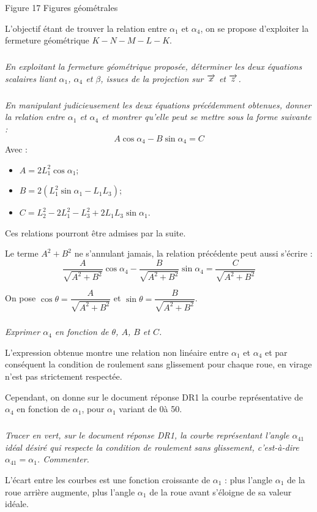 \documentclass[10pt]{article}
\begin{document}
Figure 17 Figures géométrales

L’objectif étant de trouver la relation entre $\alpha_1$ et $\alpha_4$, on se propose d’exploiter la fermeture géométrique $K-N-M-L-K$.

\subparagraph{}\textit{En exploitant la fermeture géométrique proposée, déterminer les deux équations scalaires liant $\alpha_1$, $\alpha_4$ et $\beta$, issues de la projection sur 
$\overrightarrow{x}$ et  $\overrightarrow{z}$.}
 
\subparagraph{}\textit{En manipulant judicieusement les deux équations précédemment obtenues, donner la relation entre $\alpha_1$ et $\alpha_4$ et montrer qu’elle peut se mettre sous la forme suivante :}
$$
A\cos\alpha_4 - B\sin\alpha_4 = C
$$
Avec :
\begin{itemize}
\item $A = 2L_1^2 \cos\alpha_1$;
\item $B = 2\left(L_1^2 \sin\alpha_1 -L_1L_3\right)$;
\item $C = L_2^2 -2L_1^2 -L_3^2 + 2L_1L_3\sin\alpha_1$.
\end{itemize}
	 
Ces relations pourront être admises par la suite.

 Le terme $A^2+B^2$ ne s’annulant jamais, la relation précédente peut aussi s’écrire :
 $$
 \dfrac{A}{\sqrt{A^2+B^2}} \cos\alpha_4 -  \dfrac{B}{\sqrt{A^2+B^2}} \sin\alpha_4
 =
  \dfrac{C}{\sqrt{A^2+B^2}} 
 $$
 
 On pose $\cos\theta =  \dfrac{A}{\sqrt{A^2+B^2}} $ et $\sin\theta =  \dfrac{B}{\sqrt{A^2+B^2}} $. 


\subparagraph{}\textit{Exprimer $\alpha_4$ en fonction de $\theta$, $A$, $B$ et $C$.}

L’expression obtenue montre une relation non linéaire entre $\alpha_1$ et $\alpha_4$ et par conséquent la condition de roulement sans glissement pour chaque roue, en virage n’est pas strictement respectée.

Cependant, on donne sur le document réponse DR1 la courbe représentative de $\alpha_4$ en fonction de $\alpha_1$, pour $\alpha_1$ variant de 0\textdegree à 50\textdegree.

\subparagraph{}\textit{Tracer en vert, sur le document réponse DR1, la courbe  représentant l’angle $\alpha_{41}$ idéal désiré qui respecte la condition de roulement sans glissement, c'est-à-dire $\alpha_{41}=\alpha_1$. Commenter.}


L’écart entre les courbes est une fonction croissante de $\alpha_1$ : plus l’angle $\alpha_1$ de la roue arrière augmente, plus l’angle $\alpha_1$ de la roue avant s’éloigne de sa valeur idéale.
\end{document}
